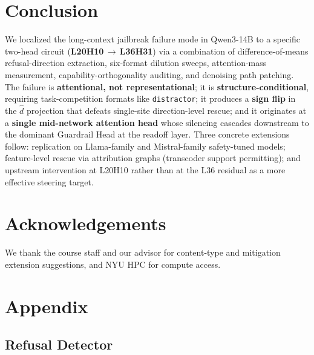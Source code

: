 \documentclass[10pt,twocolumn]{article}
\newcommand{\dhat}{\hat{d}}
\newcommand{\model}{Qwen3-14B}
\theoremstyle{definition}
\begin{document}
\section{Conclusion}
\label{sec:conclusion}

We localized the long-context jailbreak failure mode in \model{} to a
specific two-head circuit (\textbf{L20H10}\,$\to$\,\textbf{L36H31})
via a combination of difference-of-means refusal-direction extraction,
six-format dilution sweeps, attention-mass measurement,
capability-orthogonality auditing, and denoising path patching. The
failure is \textbf{attentional, not representational}; it is
\textbf{structure-conditional}, requiring task-competition formats
like \texttt{distractor}; it produces a \textbf{sign flip} in the
$\dhat$ projection that defeats single-site direction-level rescue;
and it originates at a \textbf{single mid-network attention head}
whose silencing cascades downstream to the dominant Guardrail Head at
the readoff layer. Three concrete extensions follow: replication on
Llama-family and Mistral-family safety-tuned models; feature-level
rescue via attribution graphs (transcoder support permitting); and
upstream intervention at L20H10 rather than at the L36 residual as a
more effective steering target.

\section*{Acknowledgements}
We thank the course staff and our advisor for content-type and
mitigation extension suggestions, and NYU HPC for compute access.



\appendix
\section{Appendix}
\label{app:main}

\subsection{Refusal Detector}
\label{app:refusal-detector}
\end{document}
